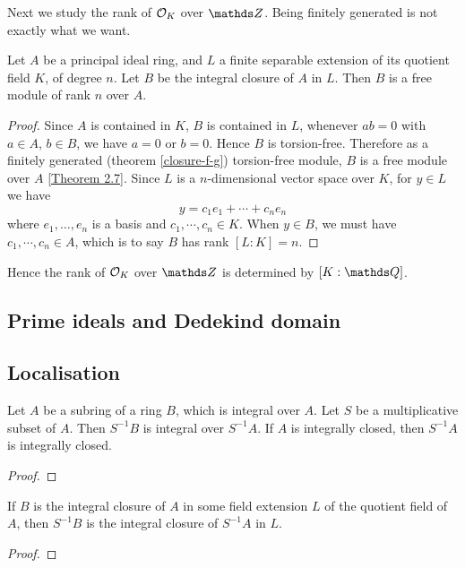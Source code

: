 			Next we study the rank of $\mathcal{O}_K$ over $\Z$. Being finitely generated is not exactly what we want.
			
			\begin{theorem}
				Let $A$ be a principal ideal ring, and $L$ a finite separable extension of its quotient field $K$, of degree $n$. Let $B$ be the integral closure of $A$ in $L$. Then $B$ is a free module of rank $n$ over $A$. 
			\end{theorem}
		
			\begin{proof}
				Since $A$ is contained in $K$, $B$ is contained in $L$, whenever $ab=0$ with $a \in A$, $b \in B$, we have $a=0$ or $b=0$. Hence $B$ is torsion-free. Therefore as a finitely generated (theorem \ref{closure-f-g}) torsion-free module, $B$ is a free module over $A$ \href{http://du.ac.in/du/uploads/departments/mathematics/study-material/MMATH18-201\%20_MT_PID.pdf}{[Theorem 2.7]}. Since $L$ is a $n$-dimensional vector space over $K$, for $y \in L$ we have
				\[
					y = c_1e_1+\cdots+c_ne_n
				\]
				where $e_1,\dots,e_n$ is a basis and $c_1,\cdots,c_n \in K$. When $y \in B$, we must have $c_1,\cdots,c_n \in A$, which is to say $B$ has rank $[L:K]=n$.
			\end{proof}
			Hence the rank of $\mathcal{O}_K$ over $\Z$ is determined by $[K:\Q]$.
		\subsection{Prime ideals and Dedekind domain}
		
		\subsection{Localisation}
		
			\begin{theorem}
				Let $A$ be a subring of a ring $B$, which is integral over $A$. Let $S$ be a multiplicative subset of $A$. Then $S^{-1}B$ is integral over $S^{-1}A$. If $A$ is integrally closed, then $S^{-1}A$ is integrally closed.
			\end{theorem}
		
			\begin{proof}
			\end{proof}
		
			\begin{corollary}
				If $B$ is the integral closure of $A$ in some field extension $L$ of the quotient field of $A$, then $S^{-1}B$ is the integral closure of $S^{-1}A$ in $L$.
			\end{corollary}
			\begin{proof}
			\end{proof}
		